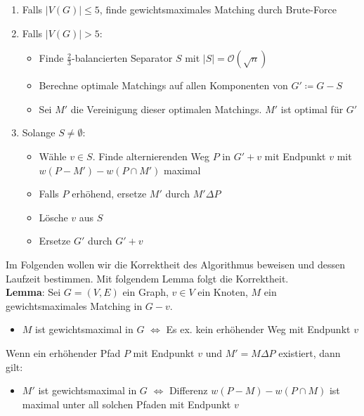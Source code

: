 \begin{enumerate}
	\item Falls $|V(G)|\leq 5$, finde gewichtsmaximales Matching durch Brute-Force
	\item Falls $|V(G)|> 5$:
	\begin{itemize}
		\item Finde $\frac{2}{3}$-balancierten Separator $S$ mit $|S|=\mathcal{O}(\sqrt{n})$
		\item Berechne optimale Matchings auf allen Komponenten von $G'\coloneqq G-S$
		\item Sei $M'$ die Vereinigung dieser optimalen Matchings. $M'$ ist optimal für $G'$
	\end{itemize} 
	\pagebreak

	\item Solange $S\neq\emptyset$:
	\begin{itemize}
		\item Wähle $v\in S$. Finde alternierenden Weg $P$ in $G'+v$ mit Endpunkt $v$ mit $w(P-M')-w(P\cap M')$ maximal
		\item Falls $P$ erhöhend, ersetze $M'$ durch $M'\Delta P$
		\item Lösche $v$ aus $S$
		\item Ersetze $G'$ durch $G'+v$
	\end{itemize}
\end{enumerate}

Im Folgenden wollen wir die Korrektheit des Algorithmus beweisen und dessen Laufzeit bestimmen. Mit folgendem Lemma folgt die Korrektheit.\\

\textbf{Lemma}: Sei $G=(V,E)$ ein Graph, $v\in V$ ein Knoten, $M$ ein gewichtsmaximales Matching in $G-v$. 
\begin{itemize}
	\item $M$ ist gewichtsmaximal in $G$ $\iff$ Es ex. kein erhöhender Weg mit Endpunkt $v$
\end{itemize}
Wenn ein erhöhender Pfad $P$ mit Endpunkt $v$ und $M'=M\Delta P$ existiert, dann gilt:
\begin{itemize}
	\item $M'$ ist gewichtsmaximal in $G$ $\iff$ Differenz $w(P-M)-w(P\cap M)$ ist maximal unter all solchen Pfaden mit Endpunkt $v$
\end{itemize}

